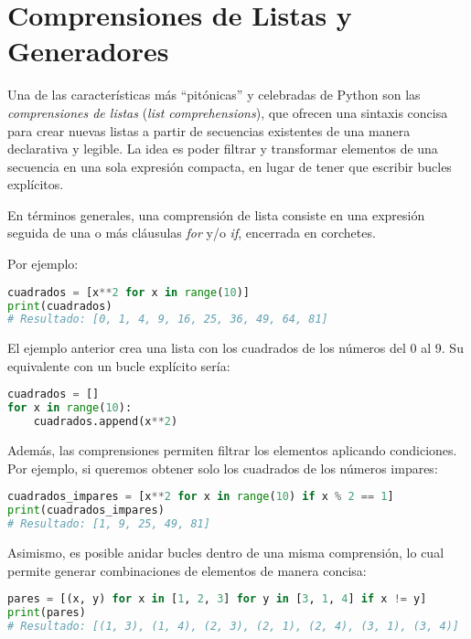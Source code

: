 \section{Comprensiones de Listas y Generadores}

Una de las características más “pitónicas” y celebradas de Python son las 
\textit{comprensiones de listas} (\textit{list comprehensions}), que ofrecen una sintaxis concisa 
para crear nuevas listas a partir de secuencias existentes de una manera declarativa y legible. 
La idea es poder filtrar y transformar elementos de una secuencia en una sola expresión compacta, 
en lugar de tener que escribir bucles explícitos.

En términos generales, una comprensión de lista consiste en una expresión seguida 
de una o más cláusulas \textit{for} y/o \textit{if}, encerrada en corchetes. 

Por ejemplo:

\begin{lstlisting}[language=Python, caption={Comprensión de lista para calcular cuadrados.}]
cuadrados = [x**2 for x in range(10)]
print(cuadrados)
# Resultado: [0, 1, 4, 9, 16, 25, 36, 49, 64, 81]
\end{lstlisting}

El ejemplo anterior crea una lista con los cuadrados de los números del 0 al 9. 
Su equivalente con un bucle explícito sería:

\begin{lstlisting}[language=Python, caption={Construcción de la lista con un bucle for.}]
cuadrados = []
for x in range(10):
    cuadrados.append(x**2)
\end{lstlisting}

Además, las comprensiones permiten filtrar los elementos aplicando condiciones. 
Por ejemplo, si queremos obtener solo los cuadrados de los números impares:

\begin{lstlisting}[language=Python, caption={Comprensión de lista con condición.}]
cuadrados_impares = [x**2 for x in range(10) if x % 2 == 1]
print(cuadrados_impares)
# Resultado: [1, 9, 25, 49, 81]
\end{lstlisting}

Asimismo, es posible anidar bucles dentro de una misma comprensión, lo cual permite 
generar combinaciones de elementos de manera concisa:

\begin{lstlisting}[language=Python, caption={Comprensión con bucles anidados.}]
pares = [(x, y) for x in [1, 2, 3] for y in [3, 1, 4] if x != y]
print(pares)
# Resultado: [(1, 3), (1, 4), (2, 3), (2, 1), (2, 4), (3, 1), (3, 4)]
\end{lstlisting}

